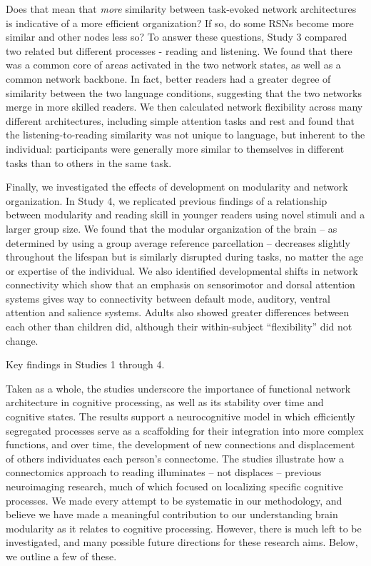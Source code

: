 Does that mean that \textit{more} similarity between task-evoked network architectures is indicative of a more efficient organization? If so, do some RSNs become more similar and other nodes less so?  To answer these questions, Study 3 compared two related but different processes - reading and listening. We found that there was a common core of areas activated in the two network states, as well as a common network backbone. In fact, better readers had a greater degree of similarity between the two language conditions, suggesting that the two networks merge in more skilled readers. We then calculated network flexibility across many different architectures, including simple attention tasks and rest and found that the listening-to-reading similarity was not unique to language, but inherent to the individual: participants were generally more similar to themselves in different tasks than to others in the same task.

Finally, we investigated the effects of development on modularity and network organization. In Study 4, we replicated previous findings of a relationship between modularity and reading skill in younger readers using novel stimuli and a larger group size. We found that the modular organization of the brain -- as determined by using a group average reference parcellation -- decreases slightly throughout the lifespan but is similarly disrupted during tasks, no matter the age or expertise of the individual. We also identified developmental shifts in network connectivity which show that an emphasis on sensorimotor and dorsal attention systems gives way to connectivity between default mode, auditory, ventral attention and salience systems. Adults also showed greater differences between each other than children did, although their within-subject ``flexibility'' did not change.

\begin{table}[t]
	\renewcommand{\tabcolsep}{0.2cm}
	\centering
	
	\caption[Key findings in Studies 1 through 4]{Key findings in Studies 1 through 4.}
	\label{table:ch6-key-findings}
\end{table}

Taken as a whole, the studies underscore the importance of functional network architecture in cognitive processing, as well as its stability over time and cognitive states. The results support a neurocognitive model in which efficiently segregated processes serve as a scaffolding for their integration into more complex functions, and over time, the development of new connections and displacement of others individuates each person's connectome. The studies illustrate how a connectomics approach to reading illuminates -- not displaces -- previous neuroimaging research, much of which focused on localizing specific cognitive processes. We made every attempt to be systematic in our methodology, and believe we have made a meaningful contribution to our understanding brain modularity as it relates to cognitive processing. However, there is much left to be investigated, and many possible future directions for these research aims. Below, we outline a few of these.

